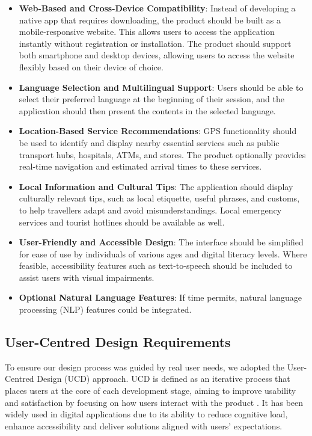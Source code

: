 \begin{itemize}
    \item \textbf{Web-Based and Cross-Device Compatibility}: Instead of developing a native app that requires downloading, the product should be built as a mobile-responsive website. This allows users to access the application instantly without registration or installation. The product should support both smartphone and desktop devices, allowing users to access the website flexibly based on their device of choice.
    \item \textbf{Language Selection and Multilingual Support}: Users should be able to select their preferred language at the beginning of their session, and the application should then present the contents in the selected language.
    \item \textbf{Location-Based Service Recommendations}: GPS functionality should be used to identify and display nearby essential services such as public transport hubs, hospitals, ATMs, and stores. The product optionally provides real-time navigation and estimated arrival times to these services.
    \item \textbf{Local Information and Cultural Tips}: The application should display culturally relevant tips, such as local etiquette, useful phrases, and customs, to help travellers adapt and avoid misunderstandings. Local emergency services and tourist hotlines should be available as well.
    \item \textbf{User-Friendly and Accessible Design}: The interface should be simplified for ease of use by individuals of various ages and digital literacy levels. Where feasible, accessibility features such as text-to-speech should be included to assist users with visual impairments.
    \item \textbf{Optional Natural Language Features}: If time permits, natural language processing (NLP) features could be integrated.
\end{itemize}


\subsection{User-Centred Design Requirements}
To ensure our design process was guided by real user needs, we adopted the User-Centred Design (UCD) approach. UCD is defined as an iterative process that places users at the core of each development stage, aiming to improve usability and satisfaction by focusing on how users interact with the product \cite{ux_ucd_interaction}. It has been widely used in digital applications due to its ability to reduce cognitive load, enhance accessibility and deliver solutions aligned with users' expectations.

